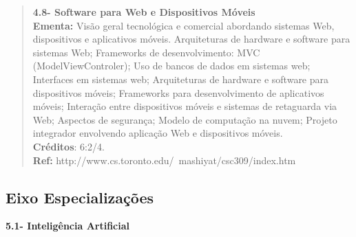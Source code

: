 \begin{quote}
\textbf{4.8-  Software para Web e Dispositivos Móveis}
\\  
\textbf{Ementa:} Visão geral tecnológica e comercial abordando sistemas Web, dispositivos e aplicativos móveis. Arquiteturas de hardware e software para sistemas Web; Frameworks de desenvolvimento: MVC (ModelViewControler); Uso de bancos de dados em sistemas web; Interfaces em sistemas web; Arquiteturas de hardware e software para dispositivos móveis; Frameworks para desenvolvimento de aplicativos móveis; Interação entre dispositivos móveis e sistemas de retaguarda via Web; Aspectos de segurança; Modelo de computação na nuvem; Projeto integrador envolvendo aplicação Web e dispositivos móveis.
\\
\textbf{Créditos}: 6:2/4.
\\
\textbf{Ref:} http://www.cs.toronto.edu/~mashiyat/csc309/index.htm
\end{quote}

\doublespacing

\subsection{Eixo Especializações}


\textbf{5.1- Inteligência Artificial }

\singlespacing

